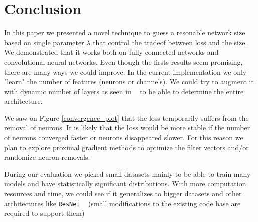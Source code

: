 \documentclass[sigconf]{acmart}
\begin{document}
\section{Conclusion}

In this paper we presented a novel technique to guess a resonable network size
based on single parameter $\lambda$ that control the tradeof between loss and
the size. We demonstrated that it works both on fully connected networks and
convolutional neural networks.  Even though the firsts results seem promising,
there are many ways we could improve. In the current implementation we only
"learn" the number of features (neurons or channels). We could try to augment
it with dynamic number of layers as seen in ~\cite{meier} to be able to
determine the entire architecture. \par We saw on Figure \ref{convergence_plot}
that the loss temporarily suffers from the removal of neurons. It is likely
that the loss would be more stable if the number of neurons converged faster or
neurons disappeared slower. For this reason we plan to explore proximal
gradient methods to optimize the filter vectors and/or randomize neuron
removals. \par During our evaluation we picked small datasets mainly to be able
to train many models and have statistically significant distributions. With
more computation resources and time, we could see if it generalizes to bigger
datasets and other architectures like \texttt{ResNet} ~\cite{He2016} (small
modifications to the existing code base are required to support them)



\end{document}
